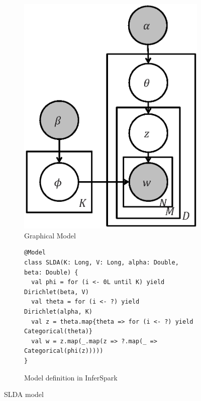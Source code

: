 \documentclass[a4paper,12pt,oneside,onecolumn,final]{book}
\begin{document}
\begin{figure}
	\centering
	\begin{subfigure}[b]{.2\textwidth}
		\includegraphics[width=\textwidth]{figs/slda.eps}
		\caption{Graphical Model}
		\label{fig:slda}
	\end{subfigure} \hfill
	\begin{subfigure}[b]{.72\textwidth}
		\begin{lstlisting}[breaklines=true]
@Model
class SLDA(K: Long, V: Long, alpha: Double, beta: Double) {
  val phi = for (i <- 0L until K) yield Dirichlet(beta, V)
  val theta = for (i <- ?) yield Dirichlet(alpha, K)
  val z = theta.map{theta => for (i <- ?) yield Categorical(theta)}
  val w = z.map(_.map(z => ?.map(_ => Categorical(phi(z)))))
}
		\end{lstlisting}
		\caption{Model definition in InferSpark}
		\label{fig:slda_model_def}
	\end{subfigure}
	\caption{SLDA model}
\end{figure}
\end{document}
